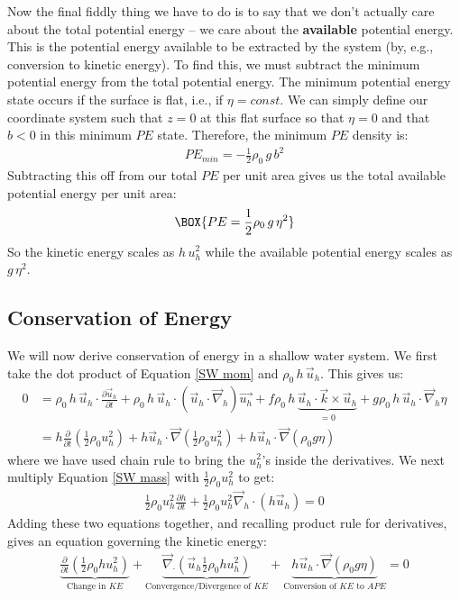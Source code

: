 Now the final fiddly thing we have to do is to say that we don't actually care about the total potential energy – we care about the \textbf{available} potential energy. This is the potential energy available to be extracted by the system (by, e.g., conversion to kinetic energy). To find this, we must subtract the minimum potential energy from the total potential energy. The minimum potential energy state occurs if the surface is flat, i.e., if $\eta=const$. We can simply define our coordinate system such that $z=0$ at this flat surface so that $\eta=0$ and that $b<0$ in this minimum $PE$ state. Therefore, the minimum $PE$ density is:
\begin{align*}
    PE_{min}=-\frac{1}{2}\rho_0 \,g \,b^2
\end{align*}
Subtracting this off from our total $PE$ per unit area gives us the total available potential energy per unit area:
\begin{align*}
    \BOX{PE = \frac{1}{2}\rho_0 \,g\,\eta^2}
\end{align*}
So the kinetic energy scales as $h\,u_h^2$ while the available potential energy scales as $g\,\eta^2$.

\subsection{Conservation of Energy}

We will now derive conservation of energy in a shallow water system. We first take the dot product of Equation \ref{SW mom} and $\rho_0 \,h\,\vec{u}_h$. This gives us:
\begin{align*}
    0&=\rho_0 \,h\,\vec{u}_h\cdot\frac{\partial \vec{u}_h}{\partial t}+
    \rho_0 \,h\,\vec{u}_h\cdot \left( \vec{u}_h\cdot \vec{\nabla}_h \right)\vec{u_h}+
    f\rho_0 \,h\,\underbrace{\vec{u}_h\cdot \vec{k}\times\vec{u}_h}_{=0}+
    g\rho_0 \,h\,\vec{u}_h\cdot\vec{\nabla}_h\eta\\
    &=h\frac{\partial}{\partial t}\left( \frac{1}{2}\rho_0 u_h^2 \right)
    +h \vec{u}_h\cdot\vec{\nabla}\left( \frac{1}{2}\rho_0 u_h^2 \right)
    +h\vec{u}_h\cdot\vec{\nabla}\left( \rho_0 g \eta \right)
\end{align*}
where we have used chain rule to bring the $u_h^2$'s inside the derivatives. We next multiply Equation \ref{SW mass} with $\frac{1}{2}\rho_0 u_h^2$ to get:
\begin{align*}
    \frac{1}{2}\rho_0 u_h^2\frac{\partial h}{\partial t}+\frac{1}{2}\rho_0 u_h^2 \vec{\nabla}_h\cdot\left( h\vec{u}_h \right)=0
\end{align*}
Adding these two equations together, and recalling product rule for derivatives, gives an equation governing the kinetic energy:
\begin{align*}
    \underbrace{\frac{\partial}{\partial t}\left( \frac{1}{2}\rho_0 h u_h^2 \right)}_{\text{Change in }KE}
    +\underbrace{\vec{\nabla}_\cdot\left( \vec{u}_h \frac{1}{2}\rho_0 h u_h^2 \right)}_{\text{Convergence/Divergence of }KE}
    +\underbrace{h\vec{u}_h \cdot\vec{\nabla}(\rho_0 g \eta)}_{\text{Conversion of }KE\text{ to }APE}=0
\end{align*}

